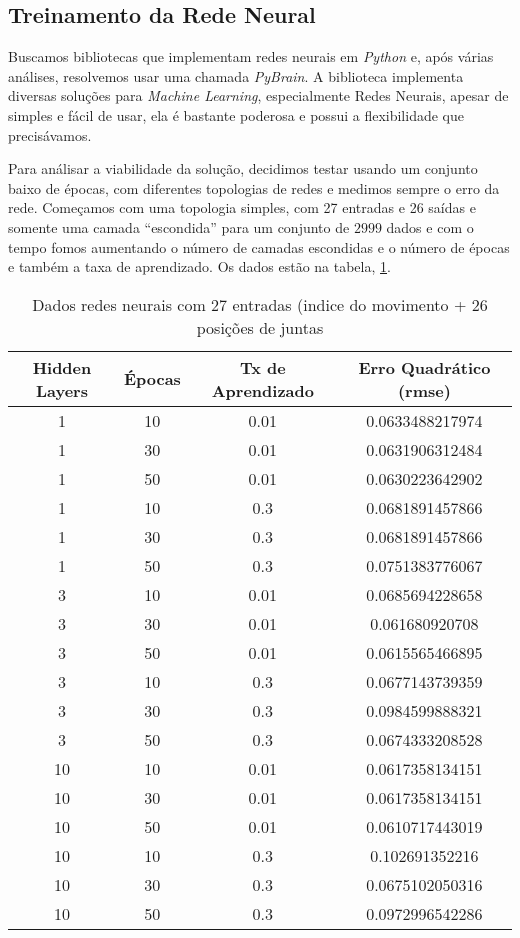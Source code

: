 \documentclass[twoside,conference,a4paper]{IEEEtran}
\begin{document}
\subsection{Treinamento da Rede Neural}

Buscamos bibliotecas que implementam redes neurais em \textsl{Python} e, após várias análises, resolvemos usar uma chamada \textsl{PyBrain}\cite{pybrain}. A biblioteca implementa diversas soluções para \textsl{Machine Learning}, especialmente Redes Neurais, apesar de simples e fácil de usar, ela é bastante poderosa e possui a flexibilidade que precisávamos.

Para análisar a viabilidade da solução, decidimos testar usando um conjunto baixo de épocas, com diferentes topologias de redes e medimos sempre o erro da rede. Começamos com uma topologia simples, com 27 entradas e 26 saídas e somente uma camada ``escondida'' para um conjunto de $2999$ dados e com o tempo fomos aumentando o número de camadas escondidas e o número de épocas e também a taxa de aprendizado. Os dados estão na tabela, \ref{redes_neurais_tabela_1}. 


 \begin{table}[h]
 \caption{Dados redes neurais com 27 entradas (indice do movimento + 26 posições de juntas}
 \label{redes_neurais_tabela_1}
 \begin{center}
 \begin{tabular}{|c|c|c|c|}
 \hline
 Hidden Layers & Épocas & Tx de Aprendizado & Erro Quadrático (rmse) \\
 \hline
 1 & 10 & 0.01 & 0.0633488217974 \\
 1 & 30 & 0.01 & 0.0631906312484 \\
 1 & 50 & 0.01 & 0.0630223642902 \\
 1 & 10 & 0.3 & 0.0681891457866 \\  
 1 & 30 & 0.3 & 0.0681891457866 \\  
 1 & 50 & 0.3 & 0.0751383776067 \\
 3 & 10 &  0.01 & 0.0685694228658 \\
 3 &  30 & 0.01 & 0.061680920708 \\ 
 3 &  50 & 0.01 & 0.0615565466895 \\
 3 & 10 &  0.3 & 0.0677143739359 \\
 3 &  30 & 0.3 & 0.0984599888321 \\
 3 &  50 & 0.3 & 0.0674333208528 \\
 10 & 10 & 0.01 & 0.0617358134151\\
10 &  30 & 0.01 &  0.0617358134151\\
10 &  50 & 0.01 & 0.0610717443019 \\
10 & 10 & 0.3  & 0.102691352216 \\
10 &  30 & 0.3 & 0.0675102050316 \\
10 &  50 & 0.3 & 0.0972996542286 \\
 \hline
 \end{tabular}
 \end{center}
 \end{table}  
 
\end{document}
